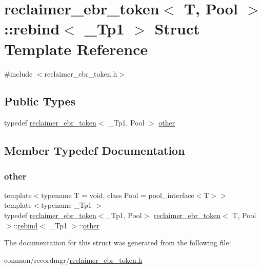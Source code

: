 \hypertarget{structreclaimer__ebr__token_1_1rebind}{}\section{reclaimer\+\_\+ebr\+\_\+token$<$ T, Pool $>$\+:\+:rebind$<$ \+\_\+\+Tp1 $>$ Struct Template Reference}
\label{structreclaimer__ebr__token_1_1rebind}


{\ttfamily \#include $<$reclaimer\+\_\+ebr\+\_\+token.\+h$>$}

\subsection*{Public Types}
\begin{DoxyCompactItemize}
\item 
typedef \hyperlink{classreclaimer__ebr__token}{reclaimer\+\_\+ebr\+\_\+token}$<$ \+\_\+\+Tp1, Pool $>$ \hyperlink{structreclaimer__ebr__token_1_1rebind_a8fc7f519586201a26f297ba493bd2871}{other}
\end{DoxyCompactItemize}


\subsection{Member Typedef Documentation}
\mbox{\label{structreclaimer__ebr__token_1_1rebind_a8fc7f519586201a26f297ba493bd2871}} 
\subsubsection{\texorpdfstring{other}{other}}
{\footnotesize\ttfamily template$<$typename T  = void, class Pool  = pool\+\_\+interface$<$\+T$>$$>$ \\
template$<$typename \+\_\+\+Tp1 $>$ \\
typedef \hyperlink{classreclaimer__ebr__token}{reclaimer\+\_\+ebr\+\_\+token}$<$\+\_\+\+Tp1, Pool$>$ \hyperlink{classreclaimer__ebr__token}{reclaimer\+\_\+ebr\+\_\+token}$<$ T, Pool $>$\+::\hyperlink{structreclaimer__ebr__token_1_1rebind}{rebind}$<$ \+\_\+\+Tp1 $>$\+::\hyperlink{structreclaimer__ebr__token_1_1rebind_a8fc7f519586201a26f297ba493bd2871}{other}}



The documentation for this struct was generated from the following file\+:\begin{DoxyCompactItemize}
\item 
common/recordmgr/\hyperlink{reclaimer__ebr__token_8h}{reclaimer\+\_\+ebr\+\_\+token.\+h}\end{DoxyCompactItemize}
